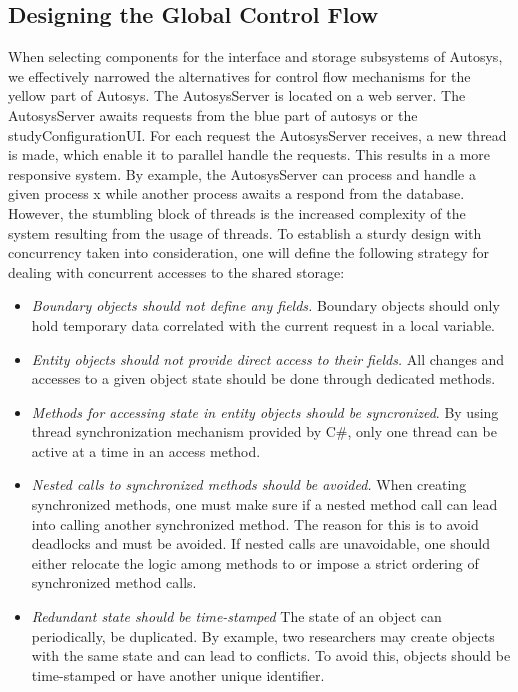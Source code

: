 \subsection{Designing the Global Control Flow}
When selecting components for the interface and storage subsystems of Autosys, we effectively narrowed the alternatives for control flow mechanisms for the yellow part of Autosys. The AutosysServer is located on a web server. The AutosysServer awaits requests from the blue part of autosys or the studyConfigurationUI. For each request the AutosysServer receives, a new thread is made, which enable it to parallel handle the requests. This results in a more responsive system. By example, the AutosysServer can process and handle a given process x while another process awaits a respond from the database. However, the stumbling block of threads is the increased complexity of the system resulting from the usage of threads. To establish a sturdy design with concurrency taken into consideration, one will define the following strategy for dealing with concurrent accesses to the shared storage:
\begin{itemize}
	\item \textit{Boundary objects should not define any fields.} Boundary objects should only hold temporary data correlated with the current request in a local variable.
	\item \textit{Entity objects should not provide direct access to their fields.} All changes and accesses to a given object state should be done through dedicated methods. 
	\item \textit{Methods for accessing state in entity objects should be syncronized}. By using thread synchronization mechanism provided by C\#, only one thread can be active at a time in an access method.
	\item \textit{Nested calls to synchronized methods should be avoided.} When creating synchronized methods, one must make sure if a nested method call can lead into calling another synchronized method. The reason for this is to avoid deadlocks and must be avoided. If nested calls are unavoidable, one should either relocate the logic among methods to or impose a strict ordering of synchronized method calls.
	\item \textit{Redundant state should be time-stamped} The state of an object can periodically, be duplicated. By example, two researchers may create objects with the same state and can lead to conflicts. To avoid this, objects should be time-stamped or have another unique identifier.

\end{itemize}


